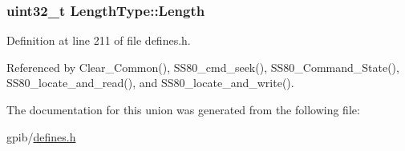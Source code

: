 \subsubsection[{\texorpdfstring{Length}{Length}}]{\setlength{\rightskip}{0pt plus 5cm}uint32\+\_\+t Length\+Type\+::\+Length}\hypertarget{unionLengthType_a27186a51a0bcb9e93e44b9f1e49e5f27}{}\label{unionLengthType_a27186a51a0bcb9e93e44b9f1e49e5f27}


Definition at line 211 of file defines.\+h.



Referenced by Clear\+\_\+\+Common(), S\+S80\+\_\+cmd\+\_\+seek(), S\+S80\+\_\+\+Command\+\_\+\+State(), S\+S80\+\_\+locate\+\_\+and\+\_\+read(), and S\+S80\+\_\+locate\+\_\+and\+\_\+write().



The documentation for this union was generated from the following file\+:\begin{DoxyCompactItemize}
\item 
gpib/\hyperlink{defines_8h}{defines.\+h}\end{DoxyCompactItemize}
